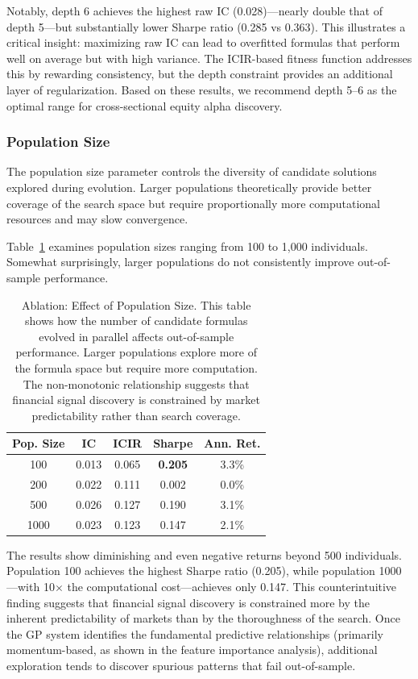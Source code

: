 \documentclass{ieeeaccess}
\begin{document}
Notably, depth 6 achieves the highest raw IC (0.028)---nearly double that of depth 5---but substantially lower Sharpe ratio (0.285 vs 0.363). This illustrates a critical insight: maximizing raw IC can lead to overfitted formulas that perform well on average but with high variance. The ICIR-based fitness function addresses this by rewarding consistency, but the depth constraint provides an additional layer of regularization. Based on these results, we recommend depth 5--6 as the optimal range for cross-sectional equity alpha discovery.

\subsubsection{Population Size}

The population size parameter controls the diversity of candidate solutions explored during evolution. Larger populations theoretically provide better coverage of the search space but require proportionally more computational resources and may slow convergence.

Table~\ref{tab:ablation_pop} examines population sizes ranging from 100 to 1,000 individuals. Somewhat surprisingly, larger populations do not consistently improve out-of-sample performance.

\begin{table}[!htbp]
\centering
\caption{Ablation: Effect of Population Size. This table shows how the number of candidate formulas evolved in parallel affects out-of-sample performance. Larger populations explore more of the formula space but require more computation. The non-monotonic relationship suggests that financial signal discovery is constrained by market predictability rather than search coverage.}
\label{tab:ablation_pop}
\begin{tabular}{ccccc}
\toprule
\textbf{Pop. Size} & \textbf{IC} & \textbf{ICIR} & \textbf{Sharpe} & \textbf{Ann. Ret.} \\
\midrule
100 & 0.013 & 0.065 & \textbf{0.205} & 3.3\% \\
200 & 0.022 & 0.111 & 0.002 & 0.0\% \\
500 & 0.026 & 0.127 & 0.190 & 3.1\% \\
1000 & 0.023 & 0.123 & 0.147 & 2.1\% \\
\bottomrule
\end{tabular}
\end{table}

The results show diminishing and even negative returns beyond 500 individuals. Population 100 achieves the highest Sharpe ratio (0.205), while population 1000---with 10$\times$ the computational cost---achieves only 0.147. This counterintuitive finding suggests that financial signal discovery is constrained more by the inherent predictability of markets than by the thoroughness of the search. Once the GP system identifies the fundamental predictive relationships (primarily momentum-based, as shown in the feature importance analysis), additional exploration tends to discover spurious patterns that fail out-of-sample.
\end{document}
